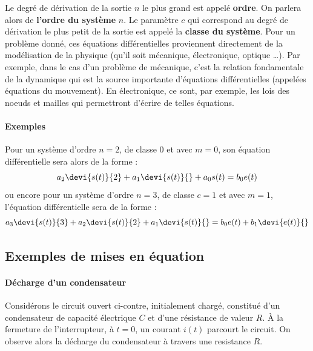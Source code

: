 Le degré de dérivation de la sortie $n$ le plus grand est appelé \textbf{ordre}.
On parlera alors de \textbf{l'ordre du système} $n$. Le paramètre $c$ qui 
correspond au degré de dérivation le plus petit de la sortie est appelé la
\textbf{classe du système}.
Pour un problème donné, ces équations différentielles proviennent 
directement de la modélisation de la physique (qu'il soit mécanique, 
électronique, optique \ldots).
Par exemple, dans le cas d'un problème de mécanique, 
c'est la relation fondamentale de la dynamique qui est 
la source importante d'équations différentielles (appelées équations 
du mouvement).
En électronique, ce sont, par exemple, les lois des noeuds et mailles qui 
permettront d'écrire de telles équations. 
\captionsetup{width=0.9\linewidth}
\paragraph{Exemples}
Pour un système d'ordre $n=2$, de classe 0 et avec $m=0$, 
son équation différentielle sera alors de la forme :
\[
    a_2\devi{s(t)}{2}+a_1\devi{s(t)}{}+a_0 s(t)=b_0e(t)
\]
ou encore pour un système d'ordre $n=3$, de classe 
$c=1$ et avec $m=1$, l'équation différentielle sera de la forme :
\[
    a_3\devi{s(t)}{3}+a_2\devi{s(t)}{2}+a_1\devi{s(t)}{}
    =b_0e(t)+b_1\devi{e(t)}{}
\]
\subsection{Exemples de mises en équation}
\paragraph{Décharge d'un condensateur\label{para-decharge}}
Considérons le circuit ouvert ci-contre, initialement chargé, constitué 
d'un condensateur de capacité électrique $C$ et d'une résistance de valeur $R$. 
À la fermeture de l'interrupteur, à $t=0$, un courant $i(t)$ parcourt 
le circuit. On observe alors la décharge du condensateur à travers 
une resistance $R$. 

